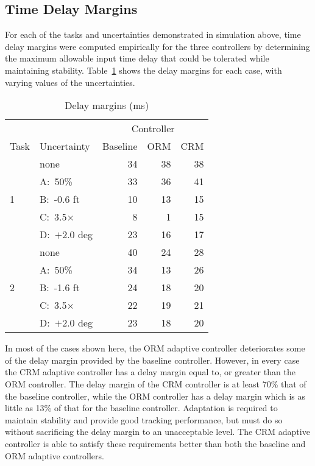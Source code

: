 \documentclass[]{../sty/aiaa-tc}
\begin{document}
  \subsection{Time Delay Margins}

  For each of the tasks and uncertainties demonstrated in simulation above, time delay margins were computed empirically for the three controllers by determining the maximum allowable input time delay that could be tolerated while maintaining stability.
  Table~\ref{tab:delaymargins} shows the delay margins for each case, with varying values of the uncertainties.

  \begin{table}[H]
    \centering
    \caption{Delay margins (ms)\label{tab:delaymargins}}
    \small
    \begin{tabular}{llrrr}
      \toprule
      & & \multicolumn{3}{c}{Controller} \\
      Task & Uncertainty & Baseline & ORM & CRM \\
      \midrule
      \multirow{5}{*}{1} & none & 34 & 38 & 38 \\
      & A:\ 50\% & 33 & 36 & 41 \\
      & B:\ -0.6 ft & 10 & 13 & 15 \\
      & C:\ 3.5$\times$ & 8 & 1 & 15 \\
      & D:\ $+$2.0 deg & 23 & 16 & 17 \\
      \midrule
      \multirow{5}{*}{2} & none & 40 & 24 & 28 \\
      & A:\ 50\% & 34 & 13 & 26 \\
      & B:\ -1.6 ft & 24 & 18 & 20 \\
      & C:\ 3.5$\times$ & 22 & 19 & 21 \\
      & D:\ $+$2.0 deg & 23 & 18 & 20 \\
      \bottomrule
    \end{tabular}
  \end{table}

  In most of the cases shown here, the ORM adaptive controller deteriorates some of the delay margin provided by the baseline controller.
  However, in every case the CRM adaptive controller has a delay margin equal to, or greater than the ORM controller.
  The delay margin of the CRM controller is at least 70\% that of the baseline controller, while the ORM controller has a delay margin which is as little as 13\% of that for the baseline controller.
  Adaptation is required to maintain stability and provide good tracking performance, but must do so without sacrificing the delay margin to an unacceptable level.
  The CRM adaptive controller is able to satisfy these requirements better than both the baseline and ORM adaptive controllers.
\end{document}
